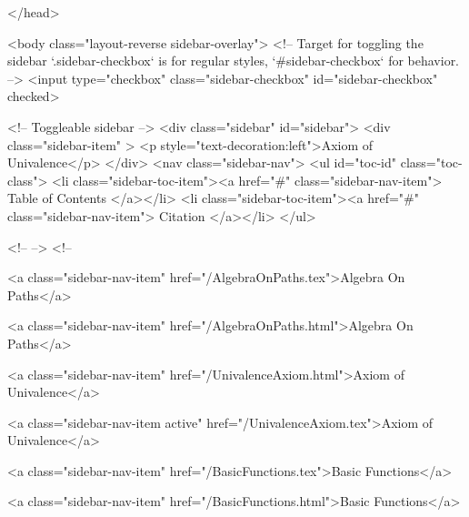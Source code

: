   
</head>




  <body class="layout-reverse sidebar-overlay">
    <!-- Target for toggling the sidebar `.sidebar-checkbox` is for regular
     styles, `#sidebar-checkbox` for behavior. -->
<input type="checkbox" class="sidebar-checkbox" id="sidebar-checkbox" checked>

<!-- Toggleable sidebar -->
<div class="sidebar" id="sidebar">
  <div class="sidebar-item" >
    <p style="text-decoration:left">Axiom of Univalence</p>
  </div>
  <nav class="sidebar-nav">
    <ul id="toc-id" class="toc-class">
  <li class="sidebar-toc-item"><a href="#" class="sidebar-nav-item"> Table of Contents </a></li>
  <li class="sidebar-toc-item"><a href="#" class="sidebar-nav-item"> Citation </a></li>
</ul>


    <!--  -->
    <!-- 
      
    
      
    
      
    
      
        
      
    
      
        
          <a class="sidebar-nav-item" href="/AlgebraOnPaths.tex">Algebra On Paths</a>
        
      
    
      
        
          <a class="sidebar-nav-item" href="/AlgebraOnPaths.html">Algebra On Paths</a>
        
      
    
      
        
          <a class="sidebar-nav-item" href="/UnivalenceAxiom.html">Axiom of Univalence</a>
        
      
    
      
        
          <a class="sidebar-nav-item active" href="/UnivalenceAxiom.tex">Axiom of Univalence</a>
        
      
    
      
        
          <a class="sidebar-nav-item" href="/BasicFunctions.tex">Basic Functions</a>
        
      
    
      
        
          <a class="sidebar-nav-item" href="/BasicFunctions.html">Basic Functions</a>
        
      
    
